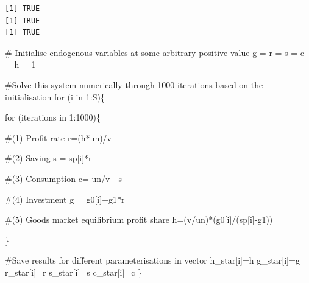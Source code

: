 \documentclass[
  letterpaper,
  DIV=11,
  numbers=noendperiod]{scrreprt}
\newenvironment{Shaded}{\begin{snugshade}}{\end{snugshade}}
\newcommand{\CommentTok}[1]{\textcolor[rgb]{0.37,0.37,0.37}{#1}}
\newcommand{\ControlFlowTok}[1]{\textcolor[rgb]{0.00,0.23,0.31}{#1}}
\newcommand{\DecValTok}[1]{\textcolor[rgb]{0.68,0.00,0.00}{#1}}
\newcommand{\NormalTok}[1]{\textcolor[rgb]{0.00,0.23,0.31}{#1}}
\newcommand{\OtherTok}[1]{\textcolor[rgb]{0.00,0.23,0.31}{#1}}
\newcommand{\SpecialCharTok}[1]{\textcolor[rgb]{0.37,0.37,0.37}{#1}}
\begin{document}
\begin{verbatim}
[1] TRUE
[1] TRUE
[1] TRUE
\end{verbatim}

\begin{Shaded}
\begin{Highlighting}[]
\CommentTok{\# Initialise endogenous variables at some arbitrary positive value }
\NormalTok{g }\OtherTok{=}\NormalTok{ r }\OtherTok{=}\NormalTok{ s }\OtherTok{=}\NormalTok{ c }\OtherTok{=}\NormalTok{ h }\OtherTok{=} \DecValTok{1}

\CommentTok{\#Solve this system numerically through 1000 iterations based on the initialisation}
\ControlFlowTok{for}\NormalTok{ (i }\ControlFlowTok{in} \DecValTok{1}\SpecialCharTok{:}\NormalTok{S)\{}
  
  \ControlFlowTok{for}\NormalTok{ (iterations }\ControlFlowTok{in} \DecValTok{1}\SpecialCharTok{:}\DecValTok{1000}\NormalTok{)\{}
    
    \CommentTok{\#(1) Profit rate}
\NormalTok{    r}\OtherTok{=}\NormalTok{(h}\SpecialCharTok{*}\NormalTok{un)}\SpecialCharTok{/}\NormalTok{v}
    
    \CommentTok{\#(2) Saving}
\NormalTok{    s }\OtherTok{=}\NormalTok{ sp[i]}\SpecialCharTok{*}\NormalTok{r}
    
    \CommentTok{\#(3) Consumption}
\NormalTok{    c}\OtherTok{=}\NormalTok{ un}\SpecialCharTok{/}\NormalTok{v }\SpecialCharTok{{-}}\NormalTok{ s}
    
    \CommentTok{\#(4) Investment}
\NormalTok{    g }\OtherTok{=}\NormalTok{ g0[i]}\SpecialCharTok{+}\NormalTok{g1}\SpecialCharTok{*}\NormalTok{r}
    
    \CommentTok{\#(5) Goods market equilibrium profit share}
\NormalTok{    h}\OtherTok{=}\NormalTok{(v}\SpecialCharTok{/}\NormalTok{un)}\SpecialCharTok{*}\NormalTok{(g0[i]}\SpecialCharTok{/}\NormalTok{(sp[i]}\SpecialCharTok{{-}}\NormalTok{g1))}
    
\NormalTok{  \}}
  
  \CommentTok{\#Save results for different parameterisations in vector}
\NormalTok{  h\_star[i]}\OtherTok{=}\NormalTok{h}
\NormalTok{  g\_star[i]}\OtherTok{=}\NormalTok{g}
\NormalTok{  r\_star[i]}\OtherTok{=}\NormalTok{r}
\NormalTok{  s\_star[i]}\OtherTok{=}\NormalTok{s}
\NormalTok{  c\_star[i]}\OtherTok{=}\NormalTok{c}
\NormalTok{\}}
\end{Highlighting}
\end{Shaded}
\end{document}
